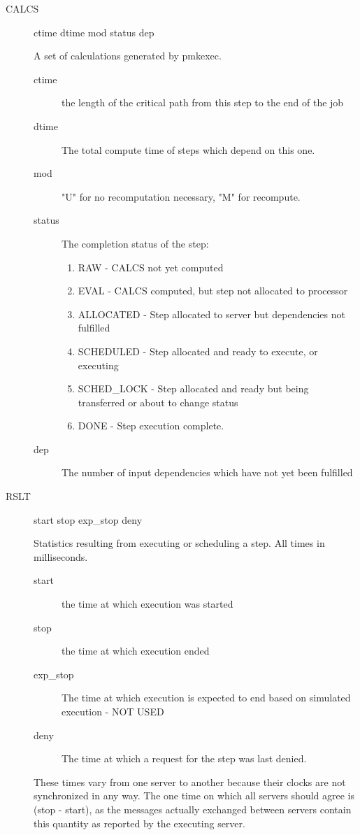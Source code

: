 \begin{itemize}
\begin{description}
\item[CALCS]  ctime dtime mod status dep

       A set of calculations generated by pmkexec.
\begin{description}
\item[ctime] the length of the critical path from this step to the end of
               the job
\item[dtime] The total compute time of steps which depend on this one.
\item[mod] "U" for no recomputation necessary, "M" for recompute.
\item[status] The completion status of the step:
\begin{enumerate}
\item RAW - CALCS not yet computed
\item EVAL - CALCS computed, but step not allocated to processor
\item ALLOCATED - Step allocated to server but dependencies not
                                 fulfilled
\item SCHEDULED - Step allocated and ready to execute,
                                 or executing
\item SCHED\_LOCK - Step allocated and ready but being transferred
                                 or about to change status
\item DONE - Step execution complete.
\end{enumerate}

\item[dep] The number of input dependencies which have not yet been fulfilled
\end{description}

\item[RSLT] start stop exp\_stop deny

       Statistics resulting from executing or scheduling a step.  All times
       in milliseconds.
\begin{description}
\item[start] the time at which execution was started 
\item[stop] the time at which execution ended
\item[exp\_stop] The time at which execution is expected to end based on
                  simulated execution - NOT USED
\item[deny] The time at which a request for the step was last denied.
\end{description}

       These times vary from one server to another because their clocks are not
       synchronized in any way.  The one time on which all servers should agree
       is (stop - start), as the messages actually exchanged between servers
       contain this quantity as reported by the executing server.


\end{description}
\end{itemize}
